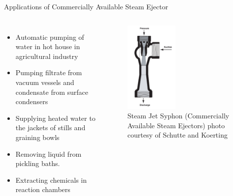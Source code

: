 \begin{frame}{Applications of Commercially Available Steam Ejector\cite{SchutteandKoerting}}
  \begin{columns}
    \begin{itemize}
        \item Automatic pumping of water in hot house in agricultural industry
        \item Pumping filtrate from vacuum vessels and condensate from surface condensers
        \item Supplying heated water to the jackets of stills and graining bowls
        \item Removing liquid from pickling baths.
        \item Extracting chemicals in reaction chambers
    \end{itemize}
    \begin{figure}
        \centering
        \includegraphics[height=4.5cm]{images/schutteandkoertingthermosyphon.png}
        \caption{\centering Steam Jet Syphon (Commercially Available Steam Ejectors) photo courtesy of Schutte and Koerting \cite{SchutteandKoerting}}
    \end{figure}
  \end{columns}
\end{frame}

